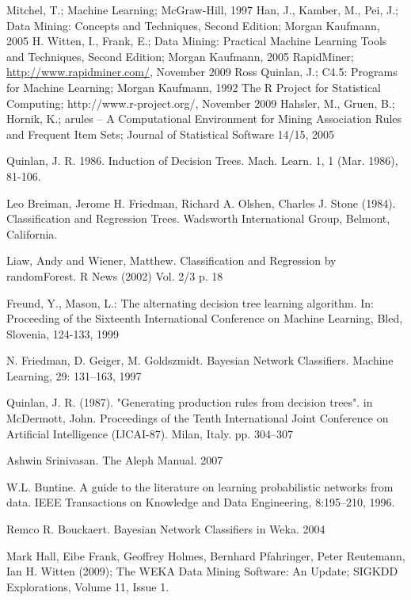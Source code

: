 \documentclass[a4paper]{llncs}
\begin{document}
\begin{thebibliography}{1}
Mitchel, T.; Machine Learning; McGraw-Hill, 1997
Han, J., Kamber, M., Pei, J.; Data Mining: Concepts and Techniques, Second Edition; Morgan Kaufmann, 2005
H. Witten, I., Frank, E.; Data Mining: Practical Machine Learning Tools and Techniques, Second Edition; Morgan Kaufmann, 2005
RapidMiner; \url{http://www.rapidminer.com/}, November 2009
Ross Quinlan, J.; C4.5: Programs for Machine Learning; Morgan Kaufmann, 1992
The R Project for Statistical Computing; http://www.r-project.org/, November 2009
Hahsler, M., Gruen, B.; Hornik, K.; arules -- A Computational Environment for Mining Association Rules and Frequent Item Sets; Journal of Statistical Software 14/15, 2005

Quinlan, J. R. 1986. Induction of Decision Trees. Mach. Learn. 1, 1 (Mar. 1986), 81-106.

Leo Breiman, Jerome H. Friedman, Richard A. Olshen, Charles J. Stone (1984). Classification and Regression Trees. Wadsworth International Group, Belmont, California.

Liaw, Andy and Wiener, Matthew. Classification and Regression by randomForest. R News (2002) Vol. 2/3 p. 18

Freund, Y., Mason, L.: The alternating decision tree learning algorithm. In: Proceeding of the Sixteenth International Conference on Machine Learning, Bled, Slovenia, 124-133, 1999

N. Friedman, D. Geiger, M. Goldszmidt. Bayesian Network Classifiers. Machine Learning, 29: 131–163, 1997

Quinlan, J. R. (1987). "Generating production rules from decision trees". in McDermott, John. Proceedings of the Tenth International Joint Conference on Artificial Intelligence (IJCAI-87). Milan, Italy. pp. 304–307

Ashwin Srinivasan. The Aleph Manual. 2007

W.L. Buntine. A guide to the literature on learning probabilistic networks from data. IEEE 
Transactions on Knowledge and Data Engineering, 8:195–210, 1996.

Remco R. Bouckaert. Bayesian Network Classifiers in Weka. 2004

Mark Hall, Eibe Frank, Geoffrey Holmes, Bernhard Pfahringer, Peter Reutemann, Ian H. Witten (2009); The WEKA Data Mining Software: An Update; SIGKDD Explorations, Volume 11, Issue 1.


\end{thebibliography}
\end{document}
